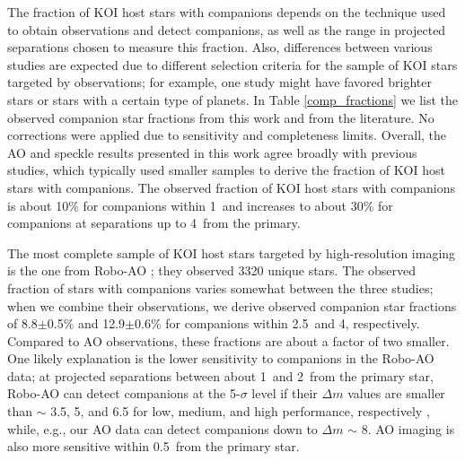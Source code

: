 \documentclass[twocolumn,appendixfloats]{aastex6}
\begin{document}
The fraction of KOI host stars with companions depends on the technique 
used to obtain observations and detect companions, as well as the range 
in projected separations chosen to measure this fraction. Also, differences 
between various studies are expected due to different selection criteria for 
the sample of KOI stars targeted by observations; for example, one study 
might have favored brighter stars or stars with a certain type of planets.
In Table \ref{comp_fractions} we list the observed companion star fractions 
from this work and from the literature. No corrections were applied due to 
sensitivity and completeness limits.
Overall, the AO and speckle results presented in this work agree broadly 
with previous studies, which typically used smaller samples to derive the 
fraction of KOI host stars with companions. The observed fraction of KOI 
host stars with companions is about 10\% for companions within 1\arcsec\ 
and increases to about 30\% for companions at separations up to 4\arcsec\ 
from the primary. 
 
The most complete sample of KOI host stars targeted by high-resolution
imaging is the one from Robo-AO \citep{law14, baranec16, ziegler16}; they 
observed 3320 unique stars. The observed fraction of stars with companions 
varies somewhat between the three studies; when we combine their 
observations, we derive observed companion star fractions of 8.8$\pm$0.5\% 
and 12.9$\pm$0.6\% for companions within 2.5\arcsec\ and 4\arcsec,
respectively. Compared to AO observations, these fractions are about
a factor of two smaller. One likely explanation is the lower sensitivity to
companions in the Robo-AO data; at projected separations between 
about 1\arcsec\ and 2\arcsec\ from the primary star, Robo-AO can detect 
companions at the 5-$\sigma$ level if their $\Delta m$ values are smaller 
than $\sim$ 3.5, 5, and 6.5 for low, medium, and high performance, 
respectively \citep{law14, baranec16, ziegler16}, while, e.g., our AO 
data can detect companions down to $\Delta m$ $\sim$ 8. AO imaging is 
also more sensitive within 0.5\arcsec\ from the primary star.
\end{document}
